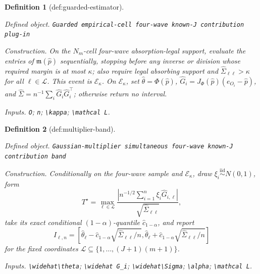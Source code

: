 \documentclass{article}
\newtheorem{definition}{Definition}
\begin{document}
\begin{definition}[def:guarded-estimator]\label{def:guarded-estimator}
\par\smallskip\noindent\emph{Defined object.} \texttt{Guarded empirical-\allowbreak{}cell four-\allowbreak{}wave known-\allowbreak{}J contribution plug-\allowbreak{}in}
\par\smallskip\noindent\emph{Construction.} On the \(N_m\)-cell four-wave absorption-legal support, evaluate the entries of \(\mathfrak m(\widehat p)\) sequentially, stopping before any inverse or division whose required margin is at most \(\kappa\); also require legal absorbing support and \(\widehat\Sigma_{\ell\ell}>\kappa\) for all \(\ell\in\mathcal L\). This event is \(\mathcal E_\kappa\). On \(\mathcal E_\kappa\), set \(\widehat\theta=\Phi(\widehat p)\), \(\widehat G_i=J_\Phi(\widehat p)(e_{O_i}-\widehat p)\), and \(\widehat\Sigma=n^{-1}\sum_i\widehat G_i\widehat G_i^\top\); otherwise return no interval.
\par\smallskip\noindent\emph{Inputs.} \texttt{O}; \texttt{n}; \texttt{\textbackslash{}\allowbreak{}kappa}; \texttt{\textbackslash{}\allowbreak{}mathcal L}.
\end{definition}

\begin{definition}[def:multiplier-band]\label{def:multiplier-band}
\par\smallskip\noindent\emph{Defined object.} \texttt{Gaussian-\allowbreak{}multiplier simultaneous four-\allowbreak{}wave known-\allowbreak{}J contribution band}
\par\smallskip\noindent\emph{Construction.} Conditionally on the four-wave sample and \(\mathcal E_\kappa\), draw \(\xi_i\stackrel{\mathrm{iid}}{\sim}N(0,1)\), form
\[
 T^\star=\max_{\ell\in\mathcal L}
 \frac{|n^{-1/2}\sum_{i=1}^n\xi_i\widehat G_{i,\ell}|}
 {\sqrt{\widehat\Sigma_{\ell\ell}}},
\]
take its exact conditional \((1-\alpha)\)-quantile \(\widehat c_{1-\alpha}\), and report
\[
 I_{\ell,n}=\left[\widehat\theta_\ell-\widehat c_{1-\alpha}
 \sqrt{\widehat\Sigma_{\ell\ell}/n},
 \widehat\theta_\ell+\widehat c_{1-\alpha}
 \sqrt{\widehat\Sigma_{\ell\ell}/n}\right]
\]
for the fixed coordinates \(\mathcal L\subseteq\{1,\ldots,(J+1)(m+1)\}\).
\par\smallskip\noindent\emph{Inputs.} \texttt{\textbackslash{}\allowbreak{}widehat\textbackslash{}\allowbreak{}theta}; \texttt{\textbackslash{}\allowbreak{}widehat G\_\allowbreak{}i}; \texttt{\textbackslash{}\allowbreak{}widehat\textbackslash{}\allowbreak{}Sigma}; \texttt{\textbackslash{}\allowbreak{}alpha}; \texttt{\textbackslash{}\allowbreak{}mathcal L}.
\end{definition}
\end{document}
